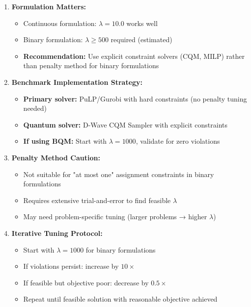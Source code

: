 \documentclass{article}
\begin{document}
\begin{enumerate}
    \item \textbf{Formulation Matters:}
    \begin{itemize}
        \item Continuous formulation: $\lambda = 10.0$ works well
        \item Binary formulation: $\lambda \geq 500$ required (estimated)
        \item \textbf{Recommendation:} Use explicit constraint solvers (CQM, MILP) rather than penalty method for binary formulations
    \end{itemize}
    
    \item \textbf{Benchmark Implementation Strategy:}
    \begin{itemize}
        \item \textbf{Primary solver:} PuLP/Gurobi with hard constraints (no penalty tuning needed)
        \item \textbf{Quantum solver:} D-Wave CQM Sampler with explicit constraints
        \item \textbf{If using BQM:} Start with $\lambda = 1000$, validate for zero violations
    \end{itemize}
    
    \item \textbf{Penalty Method Caution:}
    \begin{itemize}
        \item Not suitable for "at most one" assignment constraints in binary formulations
        \item Requires extensive trial-and-error to find feasible $\lambda$
        \item May need problem-specific tuning (larger problems → higher $\lambda$)
    \end{itemize}
    
    \item \textbf{Iterative Tuning Protocol:}
    \begin{itemize}
        \item Start with $\lambda = 1000$ for binary formulations
        \item If violations persist: increase by $10\times$
        \item If feasible but objective poor: decrease by $0.5\times$
        \item Repeat until feasible solution with reasonable objective achieved
    \end{itemize}
\end{enumerate}
\end{document}

